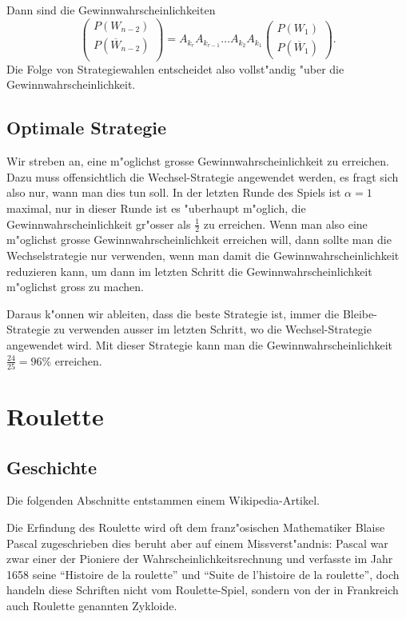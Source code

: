 Dann sind die Gewinnwahrscheinlichkeiten
\[
\begin{pmatrix}
P(W_{n-2})\\
P(\overline{W}_{n-2})\\
\end{pmatrix}
=
A_{k_r}A_{k_{r-1}}\dots A_{k_2}A_{k_1}
\begin{pmatrix}P(W_1)\\P(\overline{W}_1)\end{pmatrix}.
\]
Die Folge von Strategiewahlen entscheidet also vollst"andig "uber die
Gewinnwahrscheinlichkeit. 

\subsection{Optimale Strategie}
Wir streben an, eine m"oglichst grosse Gewinnwahrscheinlichkeit zu
erreichen. Dazu muss offensichtlich die Wechsel-Strategie angewendet
werden, es fragt sich also nur, wann man dies tun soll. 
In der letzten Runde des Spiels ist $\alpha=1$ maximal, 
nur in dieser Runde ist es "uberhaupt m"oglich, die Gewinnwahrscheinlichkeit
gr"osser als $\frac12$ zu erreichen.
Wenn man also eine m"oglichst grosse Gewinnwahrscheinlichkeit erreichen
will, dann sollte man die Wechselstrategie nur verwenden, wenn man damit
die Gewinnwahrscheinlichkeit reduzieren kann, um dann im letzten 
Schritt die Gewinnwahrscheinlichkeit m"oglichst gross zu machen.

Daraus k"onnen wir ableiten, dass die beste Strategie ist, immer die
Bleibe-Strategie zu verwenden ausser im letzten Schritt, wo die
Wechsel-Strategie angewendet wird. Mit dieser Strategie kann man
die Gewinnwahrscheinlichkeit $\frac{24}{25}= 96\%$ erreichen.

\section{Roulette}
\subsection{Geschichte}
Die folgenden Abschnitte entstammen einem Wikipedia-Artikel.

Die Erfindung des Roulette wird oft dem franz"osischen Mathematiker
Blaise Pascal zugeschrieben  dies beruht aber auf einem Missverst"andnis:
Pascal war zwar einer der Pioniere der Wahrscheinlichkeitsrechnung
und verfasste im Jahr 1658 seine ``Histoire de la roulette'' und ``Suite
de l'histoire de la roulette'', doch handeln diese Schriften nicht
vom Roulette-Spiel, sondern von der in Frankreich auch Roulette
genannten Zykloide.

